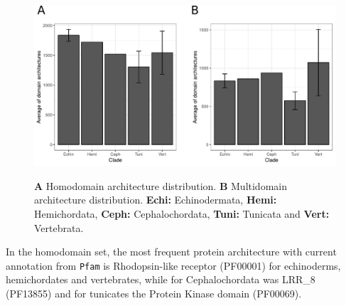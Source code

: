 \documentclass[11pt]{article}
\begin{document}
\begin{figure}[ht!]
\centering
\includegraphics[scale=0.53]{figures/completeDistributionDomains} \\
\caption{\textbf{A} Homodomain architecture distribution. 
	\textbf{B} Multidomain architecture distribution. \textbf{Echi:} 
	Echinodermata, \textbf{Hemi:} Hemichordata, \textbf{Ceph:} Cephalochordata, 
	\textbf{Tuni:} Tunicata and \textbf{Vert:} Vertebrata.
}\label{fig:domainDistr}
\end{figure}

In the homodomain set, the most frequent protein architecture with 
current annotation from \texttt{Pfam} is Rhodopsin-like receptor 
(PF00001) for echinoderms, hemichordates and vertebrates, while for 
Cephalochordata was LRR\_8 (PF13855) and for tunicates the Protein 
Kinase domain (PF00069). 

 


\end{document}
